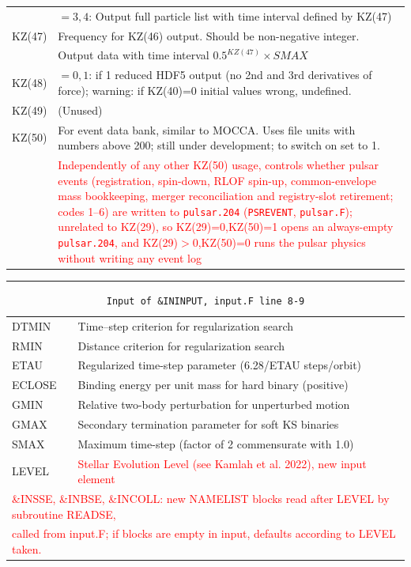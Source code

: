 \begin{longtable}{@{}p{1.5cm}p{13.0cm}}
        &  $=3,4$: Output full particle list with time interval defined by KZ(47) \\
KZ(47)  &  Frequency for KZ(46) output. Should be non-negative integer. \\
        &  Output data with time interval $0.5^{KZ(47)} \times SMAX$ \\
KZ(48)  & $=0,1$: if 1 reduced HDF5 output (no 2nd and 3rd derivatives of force); warning: if KZ(40)=0 initial values wrong, undefined. \\
KZ(49)  & (Unused) \\
KZ(50)  & For event data bank, similar to MOCCA. Uses file units with numbers above 200; still under development; to switch on set to 1. \\
        & \textcolor{red}{Independently of any other KZ(50) usage, controls whether pulsar events (registration, spin-down, RLOF spin-up, common-envelope mass bookkeeping, merger reconciliation and registry-slot retirement; codes 1--6) are written to \texttt{pulsar.204} (\texttt{PSREVENT}, \texttt{pulsar.F}); unrelated to KZ(29), so KZ(29)=0,KZ(50)=1 opens an always-empty \texttt{pulsar.204}, and KZ(29)$>$0,KZ(50)=0 runs the pulsar physics without writing any event log} \\

\end{longtable}

\hrule
\noindent
\begin{longtable}{@{}p{1.5cm}p{13.0cm}}
\caption{\texttt{Input of \&ININPUT, input.F line 8-9}}
\label{table:ininput89}\\\hline
%
DTMIN   & Time--step criterion for regularization search \\
RMIN    & Distance criterion for regularization search \\
ETAU    & Regularized time-step parameter (6.28/ETAU steps/orbit) \\
ECLOSE  & Binding energy per unit mass for hard binary (positive) \\
GMIN    & Relative two-body perturbation for unperturbed motion \\
GMAX    & Secondary termination parameter for soft KS binaries \\
SMAX    & Maximum time-step (factor of 2 commensurate with 1.0) \\
LEVEL   & \textcolor{red}{Stellar Evolution Level (see Kamlah et al. 2022), new input element} \\
\multicolumn{2}{l}{\textcolor{red}{\&INSSE, \&INBSE, \&INCOLL: new NAMELIST blocks read after LEVEL by subroutine READSE,}} \\
\multicolumn{2}{l}{\textcolor{red}{called from input.F; if blocks are empty in input, defaults according to LEVEL taken.}}
\end{longtable}

